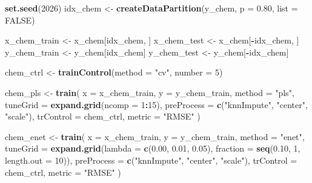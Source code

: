 \documentclass[
  11pt,
]{article}
\newenvironment{Shaded}{\begin{snugshade}}{\end{snugshade}}
\newcommand{\AttributeTok}[1]{\textcolor[rgb]{0.13,0.29,0.53}{#1}}
\newcommand{\ConstantTok}[1]{\textcolor[rgb]{0.56,0.35,0.01}{#1}}
\newcommand{\DecValTok}[1]{\textcolor[rgb]{0.00,0.00,0.81}{#1}}
\newcommand{\FloatTok}[1]{\textcolor[rgb]{0.00,0.00,0.81}{#1}}
\newcommand{\FunctionTok}[1]{\textcolor[rgb]{0.13,0.29,0.53}{\textbf{#1}}}
\newcommand{\NormalTok}[1]{#1}
\newcommand{\OtherTok}[1]{\textcolor[rgb]{0.56,0.35,0.01}{#1}}
\newcommand{\SpecialCharTok}[1]{\textcolor[rgb]{0.81,0.36,0.00}{\textbf{#1}}}
\newcommand{\StringTok}[1]{\textcolor[rgb]{0.31,0.60,0.02}{#1}}
\begin{document}
\begin{Shaded}
\begin{Highlighting}[]
\FunctionTok{set.seed}\NormalTok{(}\DecValTok{2026}\NormalTok{)}
\NormalTok{idx\_chem }\OtherTok{\textless{}{-}} \FunctionTok{createDataPartition}\NormalTok{(y\_chem, }\AttributeTok{p =} \FloatTok{0.80}\NormalTok{, }\AttributeTok{list =} \ConstantTok{FALSE}\NormalTok{)}

\NormalTok{x\_chem\_train }\OtherTok{\textless{}{-}}\NormalTok{ x\_chem[idx\_chem, ]}
\NormalTok{x\_chem\_test  }\OtherTok{\textless{}{-}}\NormalTok{ x\_chem[}\SpecialCharTok{{-}}\NormalTok{idx\_chem, ]}
\NormalTok{y\_chem\_train }\OtherTok{\textless{}{-}}\NormalTok{ y\_chem[idx\_chem]}
\NormalTok{y\_chem\_test  }\OtherTok{\textless{}{-}}\NormalTok{ y\_chem[}\SpecialCharTok{{-}}\NormalTok{idx\_chem]}

\NormalTok{chem\_ctrl }\OtherTok{\textless{}{-}} \FunctionTok{trainControl}\NormalTok{(}\AttributeTok{method =} \StringTok{"cv"}\NormalTok{, }\AttributeTok{number =} \DecValTok{5}\NormalTok{)}

\NormalTok{chem\_pls }\OtherTok{\textless{}{-}} \FunctionTok{train}\NormalTok{(}
  \AttributeTok{x =}\NormalTok{ x\_chem\_train,}
  \AttributeTok{y =}\NormalTok{ y\_chem\_train,}
  \AttributeTok{method =} \StringTok{"pls"}\NormalTok{,}
  \AttributeTok{tuneGrid =} \FunctionTok{expand.grid}\NormalTok{(}\AttributeTok{ncomp =} \DecValTok{1}\SpecialCharTok{:}\DecValTok{15}\NormalTok{),}
  \AttributeTok{preProcess =} \FunctionTok{c}\NormalTok{(}\StringTok{"knnImpute"}\NormalTok{, }\StringTok{"center"}\NormalTok{, }\StringTok{"scale"}\NormalTok{),}
  \AttributeTok{trControl =}\NormalTok{ chem\_ctrl,}
  \AttributeTok{metric =} \StringTok{"RMSE"}
\NormalTok{)}

\NormalTok{chem\_enet }\OtherTok{\textless{}{-}} \FunctionTok{train}\NormalTok{(}
  \AttributeTok{x =}\NormalTok{ x\_chem\_train,}
  \AttributeTok{y =}\NormalTok{ y\_chem\_train,}
  \AttributeTok{method =} \StringTok{"enet"}\NormalTok{,}
  \AttributeTok{tuneGrid =} \FunctionTok{expand.grid}\NormalTok{(}\AttributeTok{lambda =} \FunctionTok{c}\NormalTok{(}\FloatTok{0.00}\NormalTok{, }\FloatTok{0.01}\NormalTok{, }\FloatTok{0.05}\NormalTok{), }\AttributeTok{fraction =} \FunctionTok{seq}\NormalTok{(}\FloatTok{0.10}\NormalTok{, }\DecValTok{1}\NormalTok{, }\AttributeTok{length.out =} \DecValTok{10}\NormalTok{)),}
  \AttributeTok{preProcess =} \FunctionTok{c}\NormalTok{(}\StringTok{"knnImpute"}\NormalTok{, }\StringTok{"center"}\NormalTok{, }\StringTok{"scale"}\NormalTok{),}
  \AttributeTok{trControl =}\NormalTok{ chem\_ctrl,}
  \AttributeTok{metric =} \StringTok{"RMSE"}
\NormalTok{)}


\end{Highlighting}
\end{Shaded}
\end{document}
